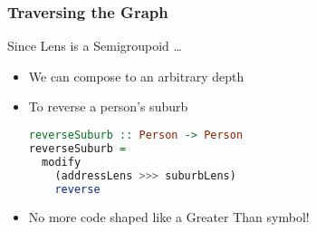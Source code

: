 \begin{frame}[fragile]
\frametitle{Traversing the Graph}

\begin{block}{Since Lens is a Semigroupoid \ldots}
\begin{itemize}
\item We can compose to an arbitrary depth
\item To reverse a person's suburb
\begin{lstlisting}[language=haskell]
reverseSuburb :: Person -> Person
reverseSuburb =
  modify 
    (addressLens >>> suburbLens)
    reverse
\end{lstlisting}
\item No more code shaped like a Greater Than symbol!

\end{itemize}
\end{block}

\end{frame}

